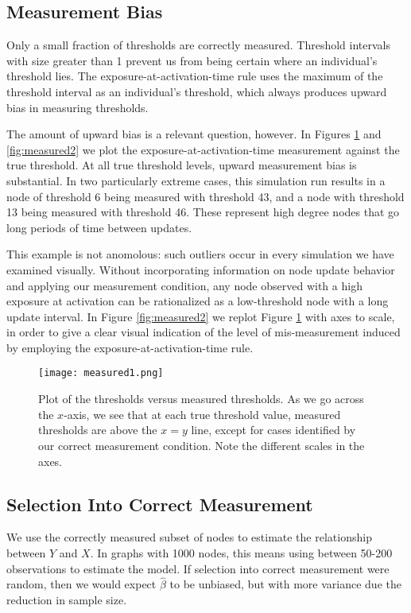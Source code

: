 \documentclass[a4paper]{article}
\begin{document}
\subsection{Measurement Bias}

Only a small fraction of thresholds are correctly measured. Threshold intervals with size greater than 1 prevent us from being certain where an individual's threshold lies. The exposure-at-activation-time rule uses the maximum of the threshold interval as an individual's threshold, which always produces upward bias in measuring thresholds.

The amount of upward bias is a relevant question, however. In Figures \ref{fig:measured1} and \ref{fig:measured2} we plot the exposure-at-activation-time measurement against the true threshold. At all true threshold levels, upward measurement bias is substantial. In two particularly extreme cases, this simulation run results in a node of threshold 6 being measured with threshold 43, and a node with threshold 13 being measured with threshold 46. These represent high degree nodes that go long periods of time between updates.

This example is not anomolous: such outliers occur in every simulation we have examined visually. Without incorporating information on node update behavior and applying our measurement condition, any node observed with a high exposure at activation can be rationalized as a low-threshold node with a long update interval. In Figure \ref{fig:measured2} we replot Figure \ref{fig:measured1} with axes to scale, in order to give a clear visual indication of the level of mis-measurement induced by employing the exposure-at-activation-time rule.

\begin{figure}[h]
\label{fig:measured1}
\texttt{[image: measured1.png]}
\caption{Plot of the thresholds versus measured thresholds. As we go across the $x$-axis, we see that at each true threshold value, measured thresholds are above the $x = y$ line, except for cases identified by our correct measurement condition. Note the different scales in the axes.}
\end{figure}

\subsection{Selection Into Correct Measurement}

We use the correctly measured subset of nodes to estimate the relationship between $Y$ and $X$. In graphs with 1000 nodes, this means using between 50-200 observations to estimate the model. If selection into correct measurement were random, then we would expect $\hat{\beta}$ to be unbiased, but with more variance due the reduction in sample size.
\end{document}
